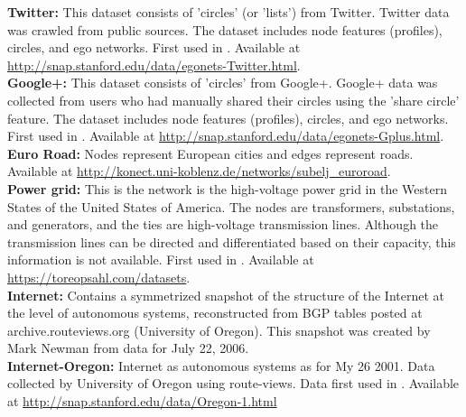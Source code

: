 \documentclass{article}
\begin{document}
\textbf{Twitter:} This dataset consists of 'circles' (or 'lists') from Twitter. Twitter data was crawled from public sources. The dataset includes node features (profiles), circles, and ego networks.  First used in \cite{Leskovec2012LearningNetworks}. Available at \url{http://snap.stanford.edu/data/egonets-Twitter.html}.\\

\textbf{Google+:} This dataset consists of 'circles' from Google+. Google+ data was collected from users who had manually shared their circles using the 'share circle' feature. The dataset includes node features (profiles), circles, and ego networks. First used in \cite{Leskovec2012LearningNetworks}. Available at \url{http://snap.stanford.edu/data/egonets-Gplus.html}.
\\

\textbf{Euro Road:} Nodes represent European cities and edges represent roads. Available at \url{http://konect.uni-koblenz.de/networks/subelj_euroroad}.
\\

\textbf{Power grid:} This is the network is the high-voltage power grid in the Western States of the United States of America. The nodes are transformers, substations, and generators, and the ties are high-voltage transmission lines. Although the transmission lines can be directed and differentiated based on their capacity, this information is not available. First used in \cite{Watts1998}. Available at \url{https://toreopsahl.com/datasets}.
\\

\textbf{Internet:} Contains a symmetrized snapshot of the structure
of the Internet at the level of autonomous systems, reconstructed from BGP
tables posted at archive.routeviews.org (University of Oregon).  This snapshot was created by Mark
Newman from data for July 22, 2006.
\\

\textbf{Internet-Oregon:} Internet as autonomous systems as for My 26 2001. Data collected by University of Oregon using route-views. Data first used in \cite{Leskovec2005GraphsExplanations}. Available at \url{http://snap.stanford.edu/data/Oregon-1.html} \\

\end{document}
